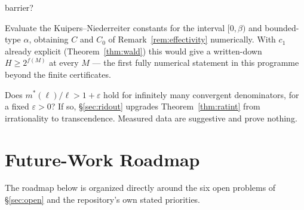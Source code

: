 \documentclass[11pt]{article}
\begin{document}
\begin{description}[leftmargin=3em,style=nextline]
barrier?
\item[Open 8 --- Explicit constants.] Evaluate the Kuipers--Niederreiter constants
\cite{KuipersNiederreiter} for the interval $[0,\beta)$ and bounded-type $\alpha$, obtaining $C$ and
$C_0$ of Remark~\ref{rem:effectivity} numerically. With $c_1$ already explicit
(Theorem~\ref{thm:wald}) this would give a written-down $H\ge2^{f(M)}$ at every $M$ --- the first
fully numerical statement in this programme beyond the finite certificates.
\item[Open 9 --- Transcendence.] Does $m^*(\ell)/\ell>1+\varepsilon$ hold for infinitely many
convergent denominators, for a fixed $\varepsilon>0$? If so, \S\ref{sec:ridout} upgrades
Theorem~\ref{thm:ratint} from irrationality to transcendence. Measured data are suggestive and prove
nothing.
\end{description}

\section{Future-Work Roadmap}
\label{sec:roadmap}

The roadmap below is organized directly around the six open problems of \S\ref{sec:open} and the repository's own stated priorities.
\end{document}
